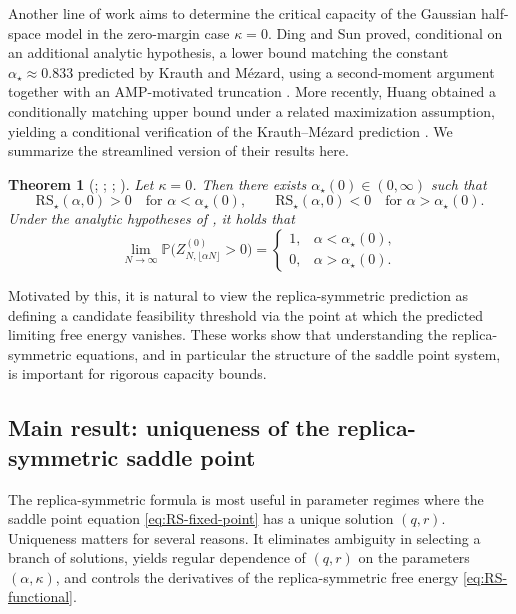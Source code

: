\documentclass[11pt]{article}
\newtheorem{theorem}{Theorem}
\begin{document}
Another line of work aims to determine the critical capacity of the Gaussian half-space model in the zero-margin case $\kappa=0$.
Ding and Sun proved, conditional on an additional analytic hypothesis, a lower bound matching the constant $\alpha_\star\approx 0.833$ predicted by Krauth and M\'ezard, using a second-moment argument together with an AMP-motivated truncation \cite{DingSun2025}.
More recently, Huang obtained a conditionally matching upper bound under a related maximization assumption, yielding a conditional verification of the Krauth--M\'ezard prediction \cite{Huang2024}.
We summarize the streamlined version of their results here.
\begin{theorem}[\cite{DingSun2025}; \cite{Xu2021}; \cite{NakajimaSun2022}; \cite{Huang2024}]\label{thm:conditional_RS_threshold_kappa0}
Let $\kappa=0$. Then there exists $\alpha_\star(0)\in(0,\infty)$ such that
\[
\mathrm{RS}_\star(\alpha,0)>0 \quad \text{for } \alpha<\alpha_\star(0),
\qquad
\mathrm{RS}_\star(\alpha,0)<0 \quad \text{for } \alpha>\alpha_\star(0).
\]
Under the analytic hypotheses of \cite{DingSun2025,Huang2024}, it holds that 
\[
\lim_{N\to\infty}\mathbb P\bigl(Z^{(0)}_{N,\lfloor \alpha N\rfloor}>0\bigr)
=
\begin{cases}
1, & \alpha<\alpha_\star(0),\\
0, & \alpha>\alpha_\star(0).
\end{cases}
\]
\end{theorem}



Motivated by this, it is natural to view the replica-symmetric prediction as defining a candidate feasibility threshold via the point at which the predicted limiting free energy vanishes. These works show that understanding the replica-symmetric equations, and in particular the structure of the saddle point system, is important for rigorous capacity bounds.

\subsection{Main result: uniqueness of the replica-symmetric saddle point} 

The replica-symmetric formula is most useful in parameter regimes where the saddle point equation \eqref{eq:RS-fixed-point} has a unique solution $(q,r)$. Uniqueness matters for several reasons. It eliminates ambiguity in selecting a branch of solutions, yields regular dependence of $(q,r)$ on the parameters $(\alpha,\kappa)$, and controls the derivatives of the replica-symmetric free energy \eqref{eq:RS-functional}. 
\end{document}
